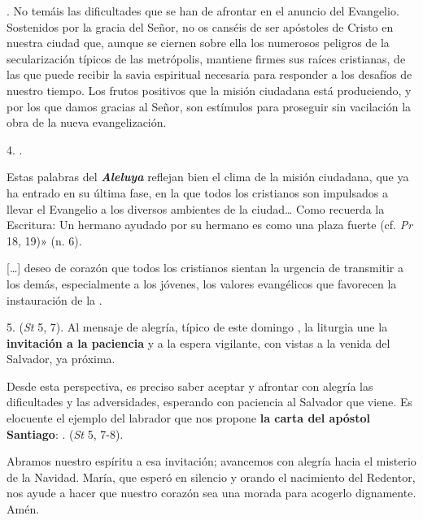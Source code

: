 \begin{body}
\begin{body}
. No temáis las dificultades que se han de afrontar en el anuncio del Evangelio. Sostenidos por la gracia del Señor, no os canséis de ser apóstoles de Cristo en nuestra ciudad que, aunque se ciernen sobre ella los numerosos peligros de la secularización típicos de las metrópolis, mantiene firmes sus raíces cristianas, de las que puede recibir la savia espiritual necesaria para responder a los desafíos de nuestro tiempo. Los frutos positivos que la misión ciudadana está produciendo, y por los que damos gracias al Señor, son estímulos para proseguir sin vacilación la obra de la nueva evangelización.

4. .

Estas palabras del \emph{\textbf{Aleluya}} reflejan bien el clima de la misión ciudadana, que ya ha entrado en su última fase, en la que todos los cristianos son impulsados a llevar el Evangelio a los diversos ambientes de la ciudad\ldots{} Como recuerda la Escritura: Un hermano ayudado por su hermano es como una plaza fuerte (cf. \emph{Pr} 18, 19)» (n. 6).

[\ldots{}] deseo de corazón que todos los cristianos sientan la urgencia de transmitir a los demás, especialmente a los jóvenes, los valores evangélicos que favorecen la instauración de la .

5.  (\emph{St} 5, 7). Al mensaje de alegría, típico de este domingo , la liturgia une la \textbf{invitación a la paciencia} y a la espera vigilante, con vistas a la venida del Salvador, ya próxima.

Desde esta perspectiva, es preciso saber aceptar y afrontar con alegría las dificultades y las adversidades, esperando con paciencia al Salvador que viene. Es elocuente el ejemplo del labrador que nos propone \textbf{la carta del apóstol Santiago}: .  (\emph{St} 5, 7-8).

Abramos nuestro espíritu a esa invitación; avancemos con alegría hacia el misterio de la Navidad. María, que esperó en silencio y orando el nacimiento del Redentor, nos ayude a hacer que nuestro corazón sea una morada para acogerlo dignamente. Amén.




\end{body}
\end{body}
